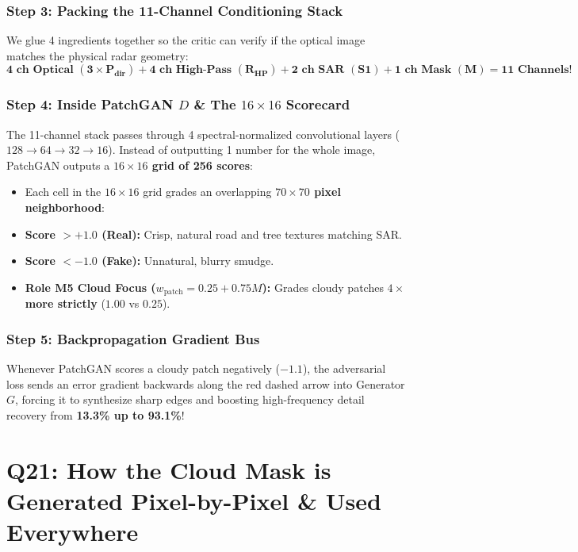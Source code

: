 \documentclass[11pt,a4paper]{article}
\begin{document}
\subsubsection*{Step 3: Packing the 11-Channel Conditioning Stack}
We glue 4 ingredients together so the critic can verify if the optical image matches the physical radar geometry:
$$\mathbf{4\text{ ch Optical } (3\times P_{\text{dir}}) + 4\text{ ch High-Pass } (R_{\text{HP}}) + 2\text{ ch SAR } (S1) + 1\text{ ch Mask } (M) = 11\text{ Channels!}}$$

\subsubsection*{Step 4: Inside PatchGAN $D$ \& The $16 \times 16$ Scorecard}
The 11-channel stack passes through 4 spectral-normalized convolutional layers ($128 \to 64 \to 32 \to 16$). Instead of outputting 1 number for the whole image, PatchGAN outputs a \textbf{$16 \times 16$ grid of 256 scores}:
\begin{itemize}[leftmargin=1.5em]
    \item Each cell in the $16 \times 16$ grid grades an overlapping \textbf{$70 \times 70$ pixel neighborhood}:
    \item \textbf{Score $> +1.0$ (Real):} Crisp, natural road and tree textures matching SAR.
    \item \textbf{Score $< -1.0$ (Fake):} Unnatural, blurry smudge.
    \item \textbf{Role M5 Cloud Focus ($w_{\text{patch}} = 0.25 + 0.75M$):} Grades cloudy patches \textbf{$4\times$ more strictly} ($1.00$ vs $0.25$).
\end{itemize}

\subsubsection*{Step 5: Backpropagation Gradient Bus}
Whenever PatchGAN scores a cloudy patch negatively ($-1.1$), the adversarial loss sends an error gradient backwards along the red dashed arrow into Generator $G$, forcing it to synthesize sharp edges and boosting high-frequency detail recovery from \textbf{13.3\% up to 93.1\%}!

\bigskip

\section{Q21: How the Cloud Mask is Generated Pixel-by-Pixel \& Used Everywhere}
\end{document}

